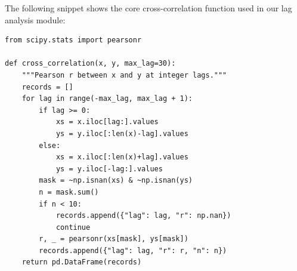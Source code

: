 The following snippet shows the core cross-correlation function used in our
lag analysis module:

\begin{verbatim}
from scipy.stats import pearsonr

def cross_correlation(x, y, max_lag=30):
    """Pearson r between x and y at integer lags."""
    records = []
    for lag in range(-max_lag, max_lag + 1):
        if lag >= 0:
            xs = x.iloc[lag:].values
            ys = y.iloc[:len(x)-lag].values
        else:
            xs = x.iloc[:len(x)+lag].values
            ys = y.iloc[-lag:].values
        mask = ~np.isnan(xs) & ~np.isnan(ys)
        n = mask.sum()
        if n < 10:
            records.append({"lag": lag, "r": np.nan})
            continue
        r, _ = pearsonr(xs[mask], ys[mask])
        records.append({"lag": lag, "r": r, "n": n})
    return pd.DataFrame(records)
\end{verbatim}



